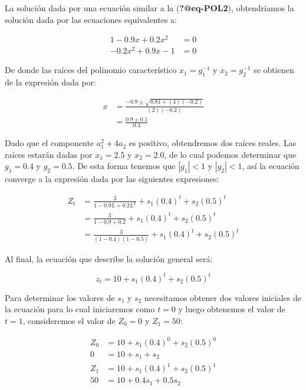 \documentclass[
  a4paper,
]{article}
\begin{document}
La solución dada por una ecuación similar a la (\textbf{?@eq-POL2}),
obtendríamos la solución dada por las ecuaciones equivalentes a:

\begin{align}
1 - 0.9 x + 0.2 x^2 & = 0 \nonumber \\ - 0.2 x^2 + 0.9 x - 1 & = 0 \nonumber
\end{align}

De donde las raíces del polinomio característico \(x_1 = g_1^{-1}\) y
\(x_2 = g_2^{-1}\) se obtienen de la expresión dada por:

\begin{align}
x & = \frac{-0.9 \pm \sqrt{0.81 + (4)(-0.2)}}{(2)(-0.2)} \nonumber \\
& = \frac{0.9 \pm 0.1}{0.4} \nonumber
\end{align}

Dado que el componente \(a^2_1 + 4 a_2\) es positivo, obtendremos dos
raíces reales. Las raíces estarán dadas por \(x_1 = 2.5\) y
\(x_2 = 2.0\), de lo cual podemos determinar que \(g_1 = 0.4\) y
\(g_2 = 0.5\). De esta forma tenemos que \(|g_1| < 1\) y \(|g_2| < 1\),
así la ecuación converge a la expresión dada por las siguientes
expresiones:

\begin{align}
Z_t & = \frac{3}{1 - 0.9 L + 0.2 L^2} + s_1 (0.4)^t + s_2 (0.5)^t \nonumber \\
& = \frac{3}{1 - 0.9 + 0.2} + s_1 (0.4)^t + s_2 (0.5)^t \nonumber \\
& = \frac{3}{(1 - 0.4)(1 - 0.5)} + s_1 (0.4)^t + s_2 (0.5)^t \nonumber
\end{align}

Al final, la ecuación que describe la solución general será:

\[
z_t = 10 + s_1 (0.4)^t + s_2 (0.5)^t
\]

Para determinar los valores de \(s_1\) y \(s_2\) necesitamos obtener dos
valores iniciales de la ecuación para lo cual iniciaremos como \(t = 0\)
y luego obtenemos el valor de \(t = 1\), consideremos el valor de
\(Z_0 = 0\) y \(Z_1 = 50\):

\begin{align*}
Z_0 & = 10 + s_1(0.4)^0 + s_2(0.5)^0 \\
0 & = 10 + s_1 + s_2 \\
Z_1 & = 10 + s_1(0.4)^1 + s_2(0.5)^1 \\
50 & = 10 + 0.4 s_1 + 0.5 s_2
\end{align*}
\end{document}
